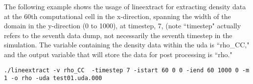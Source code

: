 The following example shows the usage of lineextract for extracting density data at the 60th computational cell in the x-direction, spanning the width of the domain in the y-direction (0 to 1000), at timestep, 7, (note ``timestep" actually 
refers to the seventh data dump, not necessarily the seventh timestep in the 
simulation. The variable containing the density data within the uda is ``rho\_CC," and the output variable that will store the data for post processing is ``rho."
\begin{Verbatim}[fontsize=\footnotesize]
./lineextract -v rho_CC  -timestep 7 -istart 60 0 0 -iend 60 1000 0 -m 1 -o rho -uda test01.uda.000
\end{Verbatim}




